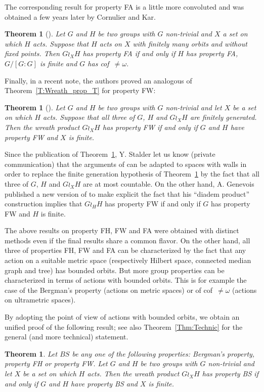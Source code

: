 \documentclass[a4paper]{article}
\newtheorem{thm}[lem]{Theorem}
\theoremstyle{definition}
\begin{document}
The corresponding result for property FA is a little more convoluted and was obtained a few years later by Cornulier and Kar.
%
%
\begin{thm}[\cite{Cornulier2011}]\label{Thm:FACK}
Let $G$ and $H$ be two groups with $G$ non-trivial and $X$ a set on which $H$ acts. Suppose that $H$ acts on $X$ with finitely many orbits and without fixed points.
Then $G\wr_XH$ has property FA if and only if $H$ has property FA, $G/[G:G]$ is finite and $G$ has cof~$\neq\omega$.
\end{thm}
%
%
Finally, in a recent note, the authors proved an analogous of Theorem~\ref{T:Wreath_prop_T} for property FW:
%
%
\begin{thm}[\cite{LS2020}]\label{Thm:PropFW}
Let $G$ and $H$ be two groups with $G$ non-trivial and let $X$ be a set on which $H$ acts. Suppose that all three of $G$, $H$ and $G\wr_XH$ are finitely generated. Then the wreath product $G \wr_X H$ has property FW if and only if $G$ and $H$ have property FW and $X$ is finite.
\end{thm}
%
%
Since the publication of Theorem~\ref{Thm:PropFW}, Y. Stalder let us know (private communication) that the arguments of \cite{LS2020} can be adapted to spaces with walls in order to replace the finite generation hypothesis of Theorem~\ref{Thm:PropFW} by the fact that all three of $G$, $H$ and $G\wr_XH$ are at most countable.
On the other hand, A. Genevois published a new version of \cite{2017arXiv170500834G} to make explicit the fact that his ``diadem product'' construction implies that $G\wr_HH$ has property FW if and only if $G$ has property FW and $H$ is finite.

The above results on property FH, FW and FA were obtained with distinct methods even if the final results share a common flavor.
On the other hand, all three of properties FH, FW and FA can be characterized by the fact that any action on a suitable metric space (respectively Hilbert space, connected median graph and tree) has bounded orbits.
But more group properties can be characterized in terms of actions with bounded orbits. This is for example the case of the Bergman's property (actions on metric spaces) or of cof~$\neq\omega$ (actions on ultrametric spaces).

By adopting the point of view of actions with bounded orbits, we obtain an unified proof of the following result; see also Theorem~\ref{Thm:Technic} for the general (and more technical) statement.
%
%
\begin{thm}\label{Thm:Main}
Let $BS$ be any one of the following properties: Bergman's property, property FH or property FW.
Let $G$ and $H$ be two groups with $G$ non-trivial and let $X$ be a set on which $H$ acts. Then the wreath product $G \wr_X H$ has property BS if and only if $G$ and $H$ have property BS and $X$ is finite.
\end{thm}
\end{document}
